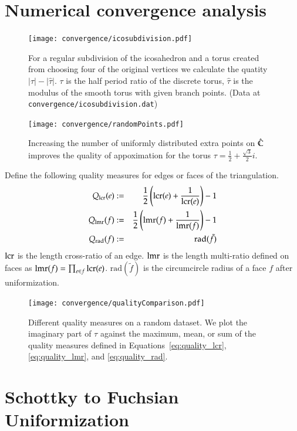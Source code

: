 \documentclass[Thesis.tex]{subfiles}
\begin{document}
\section{Numerical convergence analysis}

\begin{figure}
\centering
\texttt{[image: convergence/icosubdivision.pdf]}
\caption{For a regular subdivision of the icosahedron and a torus created from choosing
four of the original vertices we calculate the quatity $|\tau|-|\hat\tau|$. $\tau$ is the 
half period ratio of the discrete torus, $\hat\tau$ is the modulus of the smooth torus
with given branch points. (Data at {\tt convergence/icosubdivision.dat})}
\label{fig:convergence_subdivision}
\end{figure}


\begin{figure}
\centering
\texttt{[image: convergence/randomPoints.pdf]}
\caption{Increasing the number of uniformly distributed extra points on $\hat{\mathbb C}$ improves the quality of appoximation for the torus $\tau=\frac{1}{2}+\frac{\sqrt 3}{2}i$.}
\label{fig:convergence_random}
\end{figure}

Define the following quality measures for edges or faces of the triangulation.
\begin{eqnarray}
	Q_{\operatorname{lcr}}(e) &:=& \frac{1}{2}\left(\operatorname{lcr}(e) + \frac{1}{\operatorname{lcr}(e)}\right) - 1\label{eq:quality_lcr}\\
	Q_{\operatorname{lmr}}(f) &:=& \frac{1}{2}\left(\operatorname{lmr}(f) + \frac{1}{\operatorname{lmr}(f)}\right) - 1\label{eq:quality_lmr}\\
	Q_{\mathrm{rad}}(f) &:=& \mathrm{rad}(\tilde{f})\label{eq:quality_rad}
\end{eqnarray}
$\operatorname{lcr}$ is the length cross-ratio of an edge. $\operatorname{lmr}$ is the length multi-ratio defined on faces as $\operatorname{lmr}(f)=\prod_{e \in f}\operatorname{lcr}(e)$. $\mathrm{rad}(\tilde{f})$ is the circumcircle radius of a face $f$ after uniformization.

\begin{figure}
\centering
\texttt{[image: convergence/qualityComparison.pdf]}
\caption{Different quality measures on a random dataset. We plot the imaginary part of $\tau$ against the maximum, mean, or sum of the quality measures defined in Equations~\ref{eq:quality_lcr}, \ref{eq:quality_lmr}, and \ref{eq:quality_rad}.}
\label{fig:convergence_quality}
\end{figure}



\section{Schottky to Fuchsian Uniformization}
\label{sec:schottky_examples}
\end{document}
